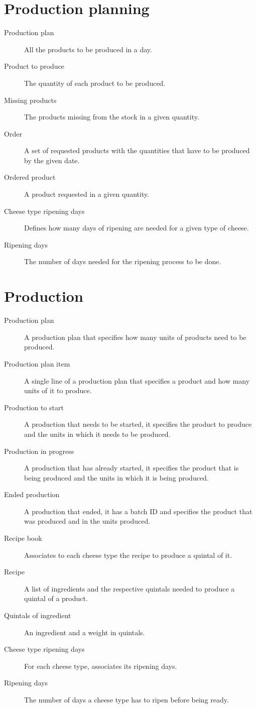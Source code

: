 \section{Production planning}
\begin{description}
    \item [Production plan] All the products to be produced in a day.
    \item [Product to produce] The quantity of each product to be produced.
    \item [Missing products] The products missing from the stock in a given quantity.
    \item [Order] A set of requested products with the quantities that have to be produced by the given date.
    \item [Ordered product] A product requested in a given quantity.
    \item [Cheese type ripening days] Defines how many days of ripening are needed for a given type of cheese.
    \item [Ripening days] The number of days needed for the ripening process to be done.
\end{description}

\section{Production}
\begin{description}
    \item [Production plan] A production plan that specifies how many units of products need to be produced.
    \item [Production plan item] A single line of a production plan that specifies a product and how many units of it to produce.
    \item [Production to start] A production that needs to be started, it specifies the product to produce and the units in which it needs to be produced.
    \item [Production in progress] A production that has already started, it specifies the product that is being produced and the units in which it is being produced.
    \item [Ended production] A production that ended, it has a batch ID and specifies the product that was produced and in the units produced.
    \item [Recipe book] Associates to each cheese type the recipe to produce a quintal of it.
    \item [Recipe] A list of ingredients and the respective quintals needed to produce a quintal of a product.
    \item [Quintals of ingredient] An ingredient and a weight in quintals.
    \item [Cheese type ripening days] For each cheese type, associates its ripening days.
    \item [Ripening days] The number of days a cheese type has to ripen before being ready.
\end{description}


